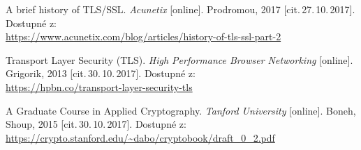 \begin{literatura}{9}
	   
	A brief history of TLS/SSL.
	\emph{Acunetix} [online]. Prodromou, 2017 [cit.\,27.\,10.\,2017]. 
	Dostupné z: \\ \url{https://www.acunetix.com/blog/articles/history-of-tls-ssl-part-2}
	
	Transport Layer Security (TLS).
	\emph{High Performance Browser Networking} [online]. Grigorik, 2013 
	[cit.\,30.\,10.\,2017].
	Dostupné z: \\ \url{https://hpbn.co/transport-layer-security-tls}
    
	A Graduate Course in Applied Cryptography.
	\emph{Tanford University} [online]. Boneh, Shoup, 2015 [cit.\,30.\,10.\,2017]. 
	Dostupné z: \\ \url{https://crypto.stanford.edu/~dabo/cryptobook/draft_0_2.pdf}

\end{literatura}
